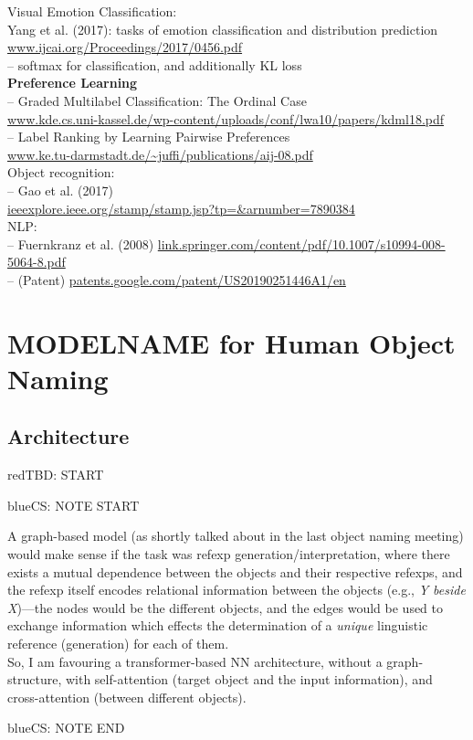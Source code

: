 \documentclass[11pt,a4paper]{article}
\newcommand{\cs}[1]{\begin{color}{blue}CS: #1\end{color}\xspace}
\newcommand{\tbd}[1]{\begin{color}{red}TBD: #1\end{color}\xspace}
\begin{document}
\noindent
Visual Emotion Classification: \\
Yang et al. (2017): tasks of emotion classification and distribution prediction  \url{www.ijcai.org/Proceedings/2017/0456.pdf}\\
-- softmax for classification, and additionally KL loss\\

\noindent
\textbf{Preference Learning}\\
-- Graded Multilabel Classification: The Ordinal Case\\
\url{www.kde.cs.uni-kassel.de/wp-content/uploads/conf/lwa10/papers/kdml18.pdf}   \\
\noindent
-- Label Ranking by Learning Pairwise Preferences\\
\url{www.ke.tu-darmstadt.de/~juffi/publications/aij-08.pdf}\\

\noindent
Object recognition: \\
-- Gao et al. (2017)\\ \url{ieeexplore.ieee.org/stamp/stamp.jsp?tp=&arnumber=7890384}\\

\noindent
NLP:\\
-- Fuernkranz et al. (2008) \url{link.springer.com/content/pdf/10.1007/s10994-008-5064-8.pdf}\\
-- (Patent)
\url{patents.google.com/patent/US20190251446A1/en}\\



\section{MODELNAME for Human Object Naming}
\label{sec:method}

\subsection{Architecture}
\label{ssec:model_architecture}
\tbd{START}
\cs{NOTE START}
A graph-based model (as shortly talked about in the last object naming meeting) would make sense if the task was refexp generation/interpretation, where there exists a mutual dependence between the objects and their respective refexps, and the refexp itself encodes relational information between the objects (e.g., \textsl{Y beside X})---the nodes would be the different objects, and the edges would be used to exchange information which effects the determination of a \textit{unique} linguistic reference (generation) for each of them.\\
So, I am favouring a transformer-based NN architecture, without a graph-structure, with self-attention (target object and the input information), and cross-attention (between different objects).
\cs{NOTE END}
\end{document}
